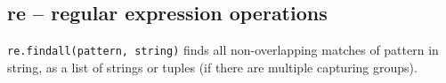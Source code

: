 %

\subsection{re -- regular expression operations}

\texttt{re.findall(pattern, string)} finds all non-overlapping matches of pattern in string, as a list of strings or tuples (if there are multiple capturing groups).

%